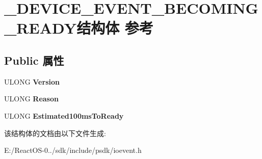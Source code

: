 \hypertarget{struct___d_e_v_i_c_e___e_v_e_n_t___b_e_c_o_m_i_n_g___r_e_a_d_y}{}\section{\+\_\+\+D\+E\+V\+I\+C\+E\+\_\+\+E\+V\+E\+N\+T\+\_\+\+B\+E\+C\+O\+M\+I\+N\+G\+\_\+\+R\+E\+A\+D\+Y结构体 参考}
\label{struct___d_e_v_i_c_e___e_v_e_n_t___b_e_c_o_m_i_n_g___r_e_a_d_y}
\subsection*{Public 属性}
\begin{DoxyCompactItemize}
\item 
\mbox{\label{struct___d_e_v_i_c_e___e_v_e_n_t___b_e_c_o_m_i_n_g___r_e_a_d_y_a4441e22de135c4eb287a952ccd7a652a}} 
U\+L\+O\+NG {\bfseries Version}
\item 
\mbox{\label{struct___d_e_v_i_c_e___e_v_e_n_t___b_e_c_o_m_i_n_g___r_e_a_d_y_a9b03cf65031d007736b294bf2361b826}} 
U\+L\+O\+NG {\bfseries Reason}
\item 
\mbox{\label{struct___d_e_v_i_c_e___e_v_e_n_t___b_e_c_o_m_i_n_g___r_e_a_d_y_a2c2d15ce865de02466df3a14de1b1ce0}} 
U\+L\+O\+NG {\bfseries Estimated100ms\+To\+Ready}
\end{DoxyCompactItemize}


该结构体的文档由以下文件生成\+:\begin{DoxyCompactItemize}
\item 
E\+:/\+React\+O\+S-\/0../sdk/include/psdk/ioevent.\+h\end{DoxyCompactItemize}
